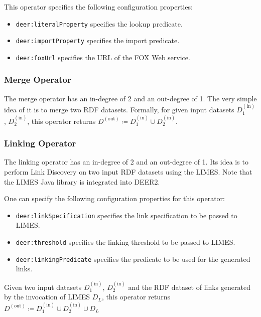 This operator specifies the following configuration properties:

\begin{itemize}
  \item \texttt{deer:literalProperty} specifies the lookup predicate.
  \item \texttt{deer:importProperty} specifies the import predicate.
  \item \texttt{deer:foxUrl} specifies the \ac{URL} of the \ac{FOX} Web service.
\end{itemize}

\subsubsection*{Merge Operator}

The merge operator has an in-degree of 2 and an out-degree of 1.
The very simple idea of it is to merge two \ac{RDF} datasets.
Formally, for given input datasets $D_1^{(\text{in})}$, $D_2^{(\text{in})}$, this operator returns $D^{(\text{out})}\coloneq D_1^{(\text{in})}\cup D_2^{(\text{in})}$.

\subsubsection*{Linking Operator}

The linking operator has an in-degree of 2 and an out-degree of 1.
Its idea is to perform Link Discovery on two input \ac{RDF} datasets using the \ac{LIMES}\cite{ngomo:2011a}.
Note that the \ac{LIMES} Java library is integrated into \ac{DEER2}.

One can specify the following configuration properties for this operator:

\begin{itemize}
  \item \texttt{deer:linkSpecification} specifies the link specification to be passed to \ac{LIMES}.
  \item \texttt{deer:threshold} specifies the linking threshold to be passed to \ac{LIMES}.
  \item \texttt{deer:linkingPredicate} specifies the predicate to be used for the generated links.
\end{itemize}

Given two input datasets $D_1^{(\text{in})}$, $D_2^{(\text{in})}$ and the \ac{RDF} dataset of links generated by the invocation of \ac{LIMES} $D_L$, this operator returns $D^{(\text{out})}\coloneq D_1^{(\text{in})}\cup D_2^{(\text{in})}\cup D_L$
